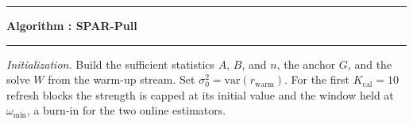 \documentclass[twoside,11pt]{article}
\newcounter{algorithm}
\begin{document}
\label{alg:spar-pull}
\noindent\begin{minipage}{\textwidth}
\hrule\vspace{3pt}
\noindent\textbf{Algorithm \thealgorithm: SPAR-Pull}\vspace{3pt}\hrule\vspace{3pt}
{\footnotesize
\emph{Initialization.} Build the sufficient statistics $A$, $B$, and $n$, the anchor $G$, and the solve $W$ from the warm-up stream. Set $\sigma^2_0 = \mathrm{var}(r_{\mathrm{warm}})$. For the first $K_{\mathrm{cal}} = 10$ refresh blocks the strength is capped at its initial value and the window held at $\omega_{\min}$, a burn-in for the two online estimators.

}
\end{minipage}
\end{document}
